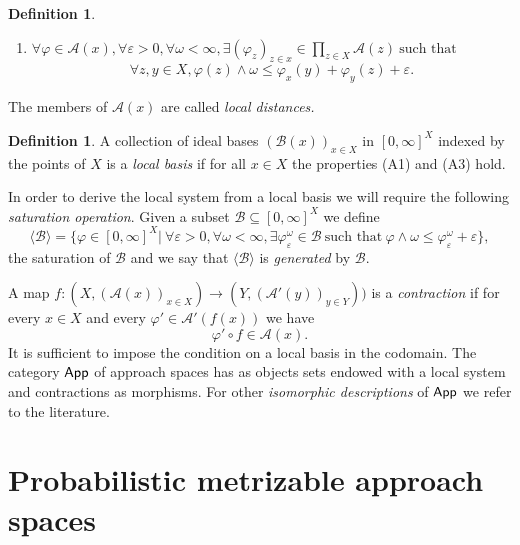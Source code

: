 \documentclass[12pt,a4paper]{amsart}
\theoremstyle{theorem}
\theoremstyle{definition}
\newtheorem{definition}[theorem]{Definition}
\newcommand{\aaa}{\ensuremath{\mathcal{A}}}
\newcommand{\bbb}{\ensuremath{\mathcal{B}}}
\newcommand{\cat}[1]{{\normalfont\mathsf{#1}}}
\newcommand{\ve}{\ensuremath{\varepsilon}}
\def\rw{\rightarrow}
\begin{document}
{\begin{definition}
\begin{enumerate}
\item [(A3)]$\forall \varphi \in \aaa(x), \forall \ve > 0,  \forall \omega < \infty, \exists (\varphi_z)_{z\in x} \in \prod_{z \in X} \aaa(z) \ \text{such that}$
$$
\forall z,y \in X, \varphi (z) \wedge \omega \leq \varphi_x(y) + \varphi_y(z) + \ve.
$$
\end{enumerate}
\end{definition}

The members of $\aaa(x)$ are called \emph{local distances.}

\begin{definition}\label{baselocaldist}
A collection of ideal bases $(\bbb(x))_{x\in X}$ in $[0,\infty]^X$ indexed by the points of $X$ is a \emph{local basis} if for all $x \in X$ the properties  (A1) and (A3) hold.
\end{definition}

In order to derive the local system from a local basis we will require the following \emph{saturation operation}.
Given a subset $\bbb \subseteq [0,\infty]^X$ we define 
\begin{equation}
\langle \bbb \rangle = \{ \varphi \in [0,\infty]^X |\  \forall \ve > 0, \forall \omega < \infty, \exists \varphi_{\ve}^{\omega} \in \bbb \ \text{such that} \ \varphi \wedge \omega \leq \varphi_{\ve}^{\omega} + \ve \},
\end{equation}
the saturation of $\bbb$ and we say that $\langle \bbb \rangle$ is \emph{generated} by $\bbb$.

A map $f: (X, (\aaa(x))_{x\in X}) \rw (Y, (\aaa'(y))_{y\in Y}))$ is a \emph{contraction} if for every $x \in X$ and every $\varphi' \in \aaa'(f(x))$ we have
\begin{equation}\label{contractsys}
\varphi' \circ f \in \aaa(x).
\end{equation}
It is sufficient to impose the condition on a local basis in the codomain.
The category $\cat{App}$ of approach spaces has as objects sets endowed with a local system and contractions as morphisms.
For other \emph{isomorphic descriptions} of $\cat{App}$ we refer to the literature.





\section{Probabilistic metrizable approach spaces}

}
\end{document}
